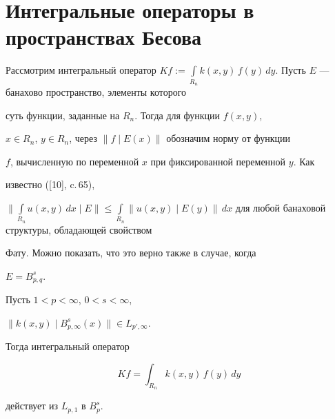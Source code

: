 \section{Интегральные операторы в пространствах Бесова}





Рассмотрим интегральный оператор $Kf:= \int\limits_{R_n}


k(x,y)\,f(y)\,dy$. Пусть $E$ --- банахово пространство, элементы которого


суть функции, заданные на $R_n$. Тогда для функции $f(x,y)$,


$x\in R_n$, $y\in R_n$, через $\| f\mid E(x)\|$ обозначим норму от функции


$f$, вычисленную по переменной $x$ при фиксированной переменной $y$. Как


известно ([10], c.\,65),


$\Big\|\int\limits_{R_n} u(x,y)\,dx \mid E\Big\| \le \int\limits_{R_n}


\|u(x,y)\mid E(y)\|\,dx$ для любой банаховой структуры, обладающей свойством


Фату. Можно показать, что это верно также в случае, когда


$E=B^s_{p,q}$.





\begin{lem}


Пусть $1<p<\infty$, $0<s<\infty$,


$\|k(x,y)\mid B^s_{p,\infty}(x)\| \in L_{p',\infty}$.


Тогда интегральный оператор


$$


Kf=\int_{R_n} k(x,y)\, f(y)\, dy


$$


действует из $L_{p,1}$ в $B^s_p$.


\end{lem}





